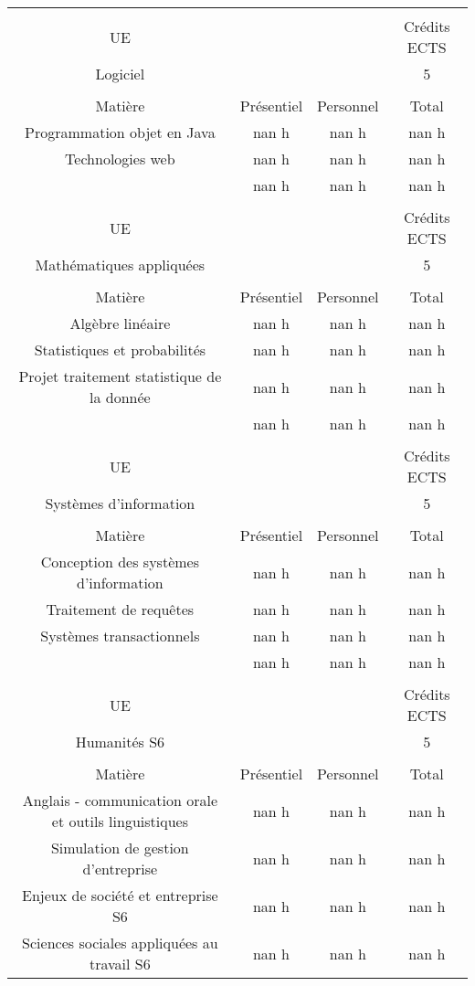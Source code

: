\begin{longtable}{c c c c}%
&&&\\%
UE&&&Crédits ECTS\\%
Logiciel&&&5\\%
&&&\\%
Matière&Présentiel&Personnel&Total\\%
Programmation objet en Java&nan h&nan h&nan h\\%
Technologies web&nan h&nan h&nan h\\%
\hline%
&nan h&nan h&nan h\\%
\hline%
&&&\\%
UE&&&Crédits ECTS\\%
Mathématiques appliquées&&&5\\%
&&&\\%
Matière&Présentiel&Personnel&Total\\%
Algèbre linéaire&nan h&nan h&nan h\\%
Statistiques et probabilités&nan h&nan h&nan h\\%
Projet traitement statistique de la donnée&nan h&nan h&nan h\\%
\hline%
&nan h&nan h&nan h\\%
\hline%
&&&\\%
UE&&&Crédits ECTS\\%
Systèmes d'information&&&5\\%
&&&\\%
Matière&Présentiel&Personnel&Total\\%
Conception des systèmes d'information&nan h&nan h&nan h\\%
Traitement de requêtes&nan h&nan h&nan h\\%
Systèmes transactionnels&nan h&nan h&nan h\\%
\hline%
&nan h&nan h&nan h\\%
\hline%
&&&\\%
UE&&&Crédits ECTS\\%
Humanités S6 &&&5\\%
&&&\\%
Matière&Présentiel&Personnel&Total\\%
Anglais {-} communication orale et outils linguistiques&nan h&nan h&nan h\\%
Simulation de gestion d'entreprise&nan h&nan h&nan h\\%
Enjeux de société et entreprise S6&nan h&nan h&nan h\\%
Sciences sociales appliquées au travail S6&nan h&nan h&nan h\\%

\end{longtable}
